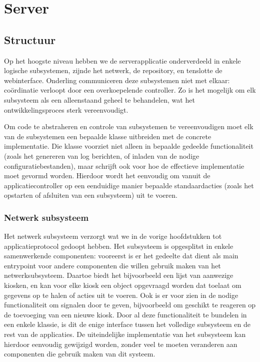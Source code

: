 \documentclass[verslag.tex]{subfiles}
\begin{document}
\part{Server}
\label{server}

\chapter{Structuur}

Op het hoogste niveau hebben we de serverapplicatie onderverdeeld in enkele logische subsystemen, zijnde het netwerk, de repository, en tenslotte de webinterface. Onderling communiceren deze subsystemen niet met elkaar: coördinatie verloopt door een overkoepelende controller. Zo is het mogelijk om elk subsysteem als een alleenstaand geheel te behandelen, wat het ontwikkelingsproces sterk vereenvoudigt.

Om code te abstraheren en controle van subsystemen te vereenvoudigen moet elk van de subsystemen een bepaalde klasse uitbreiden met de concrete implementatie. Die klasse voorziet niet alleen in bepaalde gedeelde functionaliteit (zoals het genereren van log berichten, of inladen van de nodige configuratiebestanden), maar schrijft ook voor hoe de effectieve implementatie moet gevormd worden. Hierdoor wordt het eenvoudig om vanuit de applicatiecontroller op een eenduidige manier bepaalde standaardacties (zoals het opstarten of afsluiten van een subsysteem) uit te voeren.

\section{Netwerk subsysteem}

Het netwerk subsysteem verzorgt wat we in de vorige hoofdstukken tot applicatieprotocol gedoopt hebben. Het subsysteem is opgesplitst in enkele samenwerkende componenten: vooreerst is er het gedeelte dat dient als main entrypoint voor andere componenten die willen gebruik maken van het netwerksubsysteem. Daartoe biedt het bijvoorbeeld een lijst van aanwezige kiosken, en kan voor elke kiosk een object opgevraagd worden dat toelaat om gegevens op te halen of acties uit te voeren. Ook is er voor zien in de nodige functionaliteit om signalen door te geven, bijvoorbeeld om geschikt te reageren op de toevoeging van een nieuwe kiosk.
Door al deze functionaliteit te bundelen in een enkele klassie, is dit de enige interface tussen het volledige subsysteem en de rest van de applicaties. De uiteindelijke implementatie van het subsysteem kan hierdoor eenvoudig gewijzigd worden, zonder veel te moeten veranderen aan componenten die gebruik maken van dit systeem.
\end{document}
